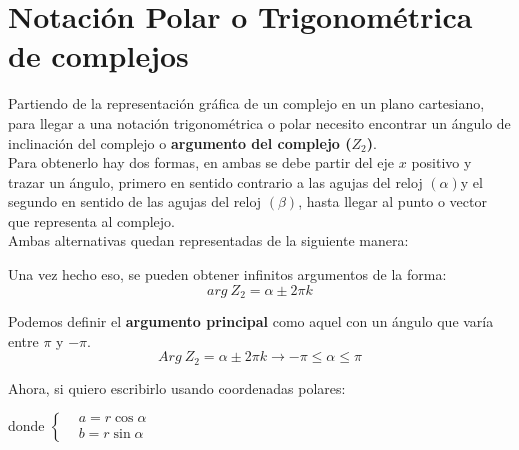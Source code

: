 \documentclass[12pt, twocolumn]{article}
\begin{document}
\section{Notación Polar o Trigonométrica de complejos}
Partiendo de la representación gráfica de un complejo en un plano cartesiano, para llegar a una notación trigonométrica o polar necesito encontrar un ángulo de inclinación del complejo o \textbf{argumento del complejo ($Z_{2}$)}. \\ 
Para obtenerlo hay dos formas, en ambas se debe partir del eje $x$ positivo y trazar un ángulo, primero en sentido contrario a las agujas del reloj  $(\alpha)$y el segundo en sentido de las agujas del reloj $(\beta)$, hasta llegar al punto o vector que representa al complejo. \\
Ambas alternativas quedan representadas de la siguiente manera:
\begin{center}
\end{center}

Una vez hecho eso, se pueden obtener infinitos argumentos de la forma:
$$arg \ Z_{2}=\alpha \pm 2\pi k$$

Podemos definir el \textbf{argumento principal} como aquel con un ángulo que varía entre $\pi$ y $-\pi$.
$$Arg \ Z_{2}=\alpha \pm 2\pi k \rightarrow -\pi\leq\alpha\leq\pi$$

Ahora, si quiero escribirlo usando coordenadas polares:
\begin{center}
\end{center}
donde $\left\{
\begin{aligned}
    &a=r\cos{\alpha}\\
    &b=r\sin{\alpha}
\end{aligned}
\right.$
\end{document}
